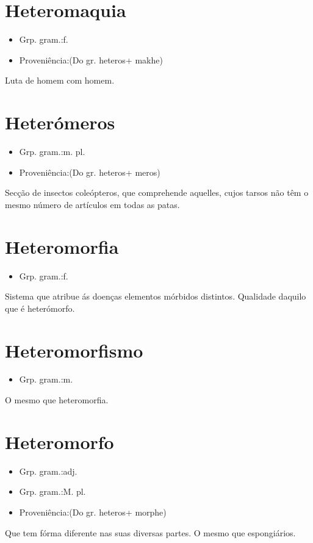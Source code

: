 \documentclass{article}
\begin{document}
\section{Heteromaquia}
\begin{itemize}
\item {Grp. gram.:f.}
\end{itemize}
\begin{itemize}
\item {Proveniência:(Do gr. \textunderscore heteros\textunderscore  + \textunderscore makhe\textunderscore )}
\end{itemize}
Luta de homem com homem.
\section{Heterómeros}
\begin{itemize}
\item {Grp. gram.:m. pl.}
\end{itemize}
\begin{itemize}
\item {Proveniência:(Do gr. \textunderscore heteros\textunderscore  + \textunderscore meros\textunderscore )}
\end{itemize}
Secção de insectos coleópteros, que comprehende aquelles, cujos tarsos não têm o mesmo número de artículos em todas as patas.
\section{Heteromorfia}
\begin{itemize}
\item {Grp. gram.:f.}
\end{itemize}
Sistema que atribue ás doenças elementos mórbidos distintos.
Qualidade daquilo que é heterómorfo.
\section{Heteromorfismo}
\begin{itemize}
\item {Grp. gram.:m.}
\end{itemize}
O mesmo que \textunderscore heteromorfia\textunderscore .
\section{Heteromorfo}
\begin{itemize}
\item {Grp. gram.:adj.}
\end{itemize}
\begin{itemize}
\item {Grp. gram.:M. pl.}
\end{itemize}
\begin{itemize}
\item {Proveniência:(Do gr. \textunderscore heteros\textunderscore  + \textunderscore morphe\textunderscore )}
\end{itemize}
Que tem fórma diferente nas suas diversas partes.
O mesmo que \textunderscore espongiários\textunderscore .
\end{document}
